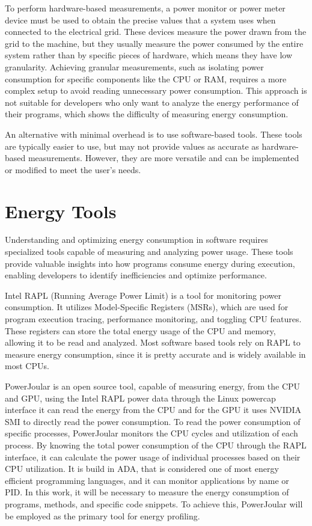 To perform hardware-based measurements, a power monitor or power meter device\cite{hackenberg2013power,ge2009powerpack} must be used to obtain the precise values that a system uses when connected to the electrical grid. These devices measure the power drawn from the grid to the machine, but they usually measure the power consumed by the entire system rather than by specific pieces of hardware, which means they have low granularity. Achieving granular measurements, such as isolating power consumption for specific components like the CPU or RAM, requires a more complex setup to avoid reading unnecessary power consumption. This approach is not suitable for developers who only want to analyze the energy performance of their programs, which shows the difficulty of measuring energy consumption.

An alternative with minimal overhead is to use software-based tools. These tools are typically easier to use, but may not provide values as accurate as hardware-based measurements. However, they are more versatile and can be implemented or modified to meet the user's needs. 

\section{Energy Tools} \label{sec:background_energy}

Understanding and optimizing energy consumption in software requires specialized tools capable of measuring and analyzing power usage. These tools provide valuable insights into how programs consume energy during execution, enabling developers to identify inefficiencies and optimize performance.

Intel RAPL (Running Average Power Limit)\cite{intel_rapl} is a tool for monitoring power consumption. It utilizes Model-Specific Registers (MSRs), which are used for program execution tracing, performance monitoring, and toggling CPU features. These registers can store the total energy usage of the CPU and memory, allowing it to be read and analyzed. Most software based tools rely on RAPL to measure energy consumption, since it is pretty accurate and is widely available in most CPUs.

PowerJoular \cite{noureddine-ie-2022} is an open source tool, capable of measuring energy, from the CPU and GPU, using the Intel RAPL power data through the Linux powercap interface it can read the energy from the CPU and for the GPU it uses NVIDIA SMI to directly read the power consumption.
To read the power consumption of specific processes, PowerJoular monitors the CPU cycles and utilization of each process. By knowing the total power consumption of the CPU through the RAPL interface, it can calculate the power usage of individual processes based on their CPU utilization.
It is build in ADA, that is considered one of most energy efficient programming languages\cite{PEREIRA2021102609}, and it can monitor applications by name or PID. In this work, it will be necessary to measure the energy consumption of programs, methods, and specific code snippets. To achieve this, PowerJoular will be employed as the primary tool for energy profiling.


